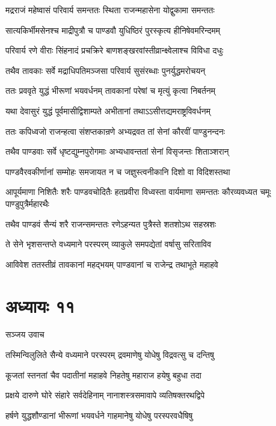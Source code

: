 \twolineshloka
{मद्रराजं महेष्वासं परिवार्य समन्ततः}
{स्थिता राजन्महासेना योद्वुकामा समन्ततः}


\twolineshloka
{सात्यकिर्भीमसेनश्च माद्रीपुत्रौ च पाण्डवौ}
{युधिष्ठिरं पुरस्कृत्य हीनिषेवमरिन्दमम्}


\twolineshloka
{परिवार्य रणे वीराः सिंहनादं प्रचक्रिरे}
{बाणशङ्खरवांस्तीव्रान्क्ष्वेलाश्च विविधा दधुः}


\twolineshloka
{तथैव तावकाः सर्वे मद्राधिपतिमञ्जसा}
{परिवार्य सुसंरब्धाः पुनर्युद्धमरोचयन्}


\twolineshloka
{ततः प्रववृते युद्धं भीरूणां भयवर्धनम्}
{तावकानां परेषां च मृत्युं कृत्वा निबर्तनम्}


\twolineshloka
{यथा देवासुरं युद्धं पूर्वमासीद्विशाम्पते}
{अभीतानां तथाऽऽसीत्तद्यमराष्ट्रविवर्धनम्}


\twolineshloka
{ततः कपिध्वजो राजन्हत्वा संशप्तकान्रणे}
{अभ्यद्रवत तां सेनां कौरवीं पाण्डुनन्दनः}


\twolineshloka
{तथैव पाण्डवाः सर्वे धृष्टद्युम्नपुरोगमाः}
{अभ्यधावन्ततां सेनां विसृजन्तः शिताञ्शरान्}


\twolineshloka
{पाण्डवैरवकीर्णानां सम्मोहः समजायत}
{न च जज्ञुस्त्वनीकानि दिशो वा विदिशस्तथा}


\threelineshloka
{आपूर्यमाणा निशितैः शरैः पाण्डवचोदितैः}
{हतप्रवीरा विध्वस्ता वार्यमाणा समन्ततः}
{कौरव्यवध्यत चमूः पाण्डुपुत्रैर्महारथैः}


\twolineshloka
{तथैव पाण्डवं सैन्यं शरै राजन्समन्ततः}
{रणेऽहन्यत पुत्रैस्ते शतशोऽथ सहस्रशः}


\twolineshloka
{ते सेने भृशसन्तप्ते वध्यमाने परस्परम्}
{व्याकुले समपद्येतां वर्षासु सरिताविव}


\twolineshloka
{आविवेश ततस्तीव्रं तावकानां महद्भयम्}
{पाण्डवानां च राजेन्द्र तथाभूते महाहवे}


\chapter{अध्यायः ११}
\twolineshloka
{सञ्जय उवाच}
{}


\twolineshloka
{तस्मिन्विलुलिते सैन्ये वध्यमाने परस्परम्}
{द्रवमाणेषु योधेषु विद्रवत्सु च दन्तिषु}


\twolineshloka
{कूजतां स्तनतां चैव पदातीनां महाहवे}
{निहतेषु महाराज हयेषु बहुधा तदा}


\twolineshloka
{प्रक्षये दारुणे घोरे संहारे सर्वदेहिनाम्}
{नानाशस्त्रसमावापे व्यतिषक्तरथद्विपे}


\twolineshloka
{हर्षणे युद्धशौण्डानां भीरूणां भयवर्धने}
{गाहमानेषु योधेषु परस्परवधैषिषु}


